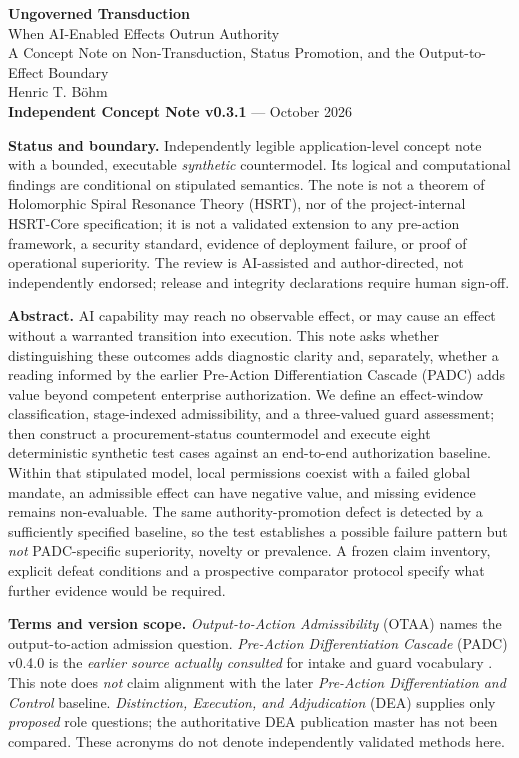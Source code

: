 \documentclass[11pt,a4paper]{article}
\begin{document}
\thispagestyle{plain}
\begin{center}
{\LARGE\bfseries\color{ink} Ungoverned Transduction}\\[5pt]
{\large When AI-Enabled Effects Outrun Authority}\\[10pt]
{\normalsize A Concept Note on Non-Transduction, Status Promotion, and the Output-to-Effect Boundary}\\[10pt]
{\normalsize Henric T. B\"ohm}\\[4pt]
{\small \textbf{Independent Concept Note v0.3.1} \;--- October 2026}
\end{center}
\vspace{3pt}
\noindent\textbf{Status and boundary.} Independently legible application-level concept note with a bounded, executable \emph{synthetic} countermodel. Its logical and computational findings are conditional on stipulated semantics. The note is not a theorem of Holomorphic Spiral Resonance Theory (HSRT), nor of the project-internal HSRT-Core specification; it is not a validated extension to any pre-action framework, a security standard, evidence of deployment failure, or proof of operational superiority. The review is AI-assisted and author-directed, not independently endorsed; release and integrity declarations require human sign-off.

\noindent\textbf{Abstract.} AI capability may reach no observable effect, or may cause an effect without a warranted transition into execution. This note asks whether distinguishing these outcomes adds diagnostic clarity and, separately, whether a reading informed by the earlier Pre-Action Differentiation Cascade (PADC) adds value beyond competent enterprise authorization. We define an effect-window classification, stage-indexed admissibility, and a three-valued guard assessment; then construct a procurement-status countermodel and execute eight deterministic synthetic test cases against an end-to-end authorization baseline. Within that stipulated model, local permissions coexist with a failed global mandate, an admissible effect can have negative value, and missing evidence remains non-evaluable. The same authority-promotion defect is detected by a sufficiently specified baseline, so the test establishes a possible failure pattern but \emph{not} PADC-specific superiority, novelty or prevalence. A frozen claim inventory, explicit defeat conditions and a prospective comparator protocol specify what further evidence would be required.

\noindent\textbf{Terms and version scope.} \emph{Output-to-Action Admissibility} (OTAA) names the output-to-action admission question. \emph{Pre-Action Differentiation Cascade} (PADC) v0.4.0 is the \emph{earlier source actually consulted} for intake and guard vocabulary \cite{padc2026}. This note does \emph{not} claim alignment with the later \emph{Pre-Action Differentiation and Control} baseline. \emph{Distinction, Execution, and Adjudication} (DEA) supplies only \emph{proposed} role questions; the authoritative DEA publication master has not been compared. These acronyms do not denote independently validated methods here.
\end{document}
